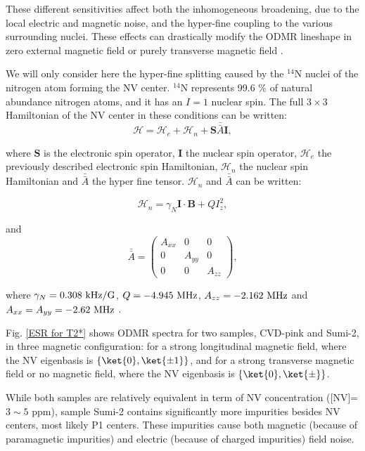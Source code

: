 \documentclass[a4paper,11pt]{report}
\begin{document}
\begin{refsection}
These different sensitivities affect both the inhomogeneous broadening, due to the local electric and magnetic noise, and the hyper-fine coupling to the various surrounding nuclei. These effects can drastically modify the ODMR lineshape in zero external magnetic field \citep{jamonneau2016competition} or purely transverse magnetic field \citep{qiu2021nuclear,qiu2022nanoscale}.

We will only consider here the hyper-fine splitting caused by the $^{14}$N nuclei of the nitrogen atom forming the NV center. $^{14}$N represents 99.6 \% of natural abundance nitrogen atoms, and it has an $I=1$ nuclear spin. The full $3\times 3$ Hamiltonian of the NV center in these conditions can be written:
\begin{equation}
\mathcal{H}=\mathcal{H}_e + \mathcal{H}_n + \mathbf{S} \bar{\bar{A}} \mathbf{I},
\end{equation}

where $\mathbf{S}$ is the electronic spin operator, $\mathbf{I}$ the nuclear spin operator, $\mathcal{H}_e$ the previously described electronic spin Hamiltonian, $\mathcal{H}_n$ the nuclear spin Hamiltonian and $\bar{\bar{A}}$ the hyper fine tensor. $\mathcal{H}_n$ and $\bar{\bar{A}}$ can be written:

\begin{equation}
\mathcal{H}_n = \gamma_N \mathbf{I} \cdot \mathbf{B} + Q I_z^2,
\end{equation}

and
\begin{equation}
\bar{\bar{A}} = \begin{pmatrix}
A_{xx} & 0 & 0 \\
0 & A_{yy} & 0 \\
0 & 0 & A_{zz}
\end{pmatrix},
\end{equation}


where $\gamma_N=0.308\ \rm kHz/G$, $Q=-4.945\ \rm MHz$, $A_{zz}=-2.162\ \rm MHz$ and $A_{xx}=A_{yy}=-2.62\ \rm MHz$ \citep{smeltzer2009robust}.

Fig. \ref{ESR for T2*} shows ODMR spectra for two samples, CVD-pink and Sumi-2, in three magnetic configuration: for a strong longitudinal magnetic field, where the NV eigenbasis is $\{ \ket{0}, \ket{\pm 1} \}$, and for a strong transverse magnetic field or no magnetic field, where the NV eigenbasis is $\{ \ket{0}, \ket{\pm} \}$. 

While both samples are relatively equivalent in term of NV concentration ([NV]=$3 \sim 5$ ppm), sample Sumi-2 contains significantly more impurities besides NV centers, most likely P1 centers. These impurities cause both magnetic (because of paramagnetic impurities) and electric (because of charged impurities) field noise.


\end{refsection}
\end{document}
